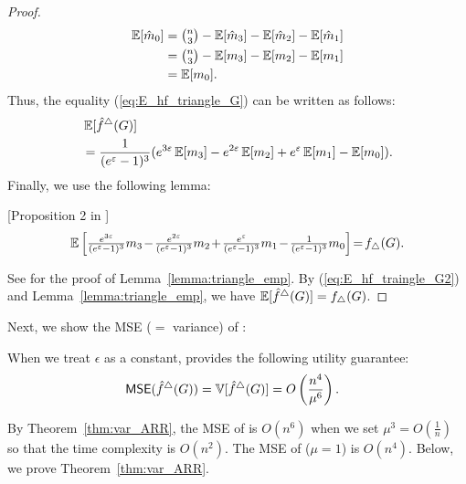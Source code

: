 \begin{proof}
\begin{align*}
\operatorname{\mathbb{E}}[\hat{m}_0]
&= \textstyle{\binom{n}{3} - \operatorname{\mathbb{E}}[\hat{m}_3] - \operatorname{\mathbb{E}}[\hat{m}_2] - \operatorname{\mathbb{E}}[\hat{m}_1]} \\
&= \textstyle{\binom{n}{3} - \operatorname{\mathbb{E}}[m_3] - \operatorname{\mathbb{E}}[m_2] - \operatorname{\mathbb{E}}[m_1]} \\
&= \operatorname{\mathbb{E}}[m_0].
\end{align*}
Thus, the equality (\ref{eq:E_hf_triangle_G}) can be written as follows:
\begin{align}
& \E[\hf^\triangle(G)] \nonumber\\
&= \frac{1}{(e^\epsilon-1)^3}(e^{3\epsilon} \E[m_3] - e^{2\epsilon} \E[m_2] + e^\epsilon \E[m_1] - \E[m_0]).
\label{eq:E_hf_traingle_G2}
\end{align}
Finally, we use the following lemma:

\begin{lemma}\label{lemma:triangle_emp}[Proposition 2 in \cite{Imola_USENIX21}]
  \begin{align}
      \textstyle{\mathbb{E}\left[ \frac{e^{3\epsilon}}{(e^\epsilon-1)^3} m_3 \hspace{-0.5mm}-\hspace{-0.5mm} \frac{e^{2\epsilon}}{(e^\epsilon-1)^3} m_2 \hspace{-0.5mm}+\hspace{-0.5mm} \frac{e^\epsilon}{(e^\epsilon-1)^3} m_1 \hspace{-0.5mm}-\hspace{-0.5mm} \frac{1}{(e^\epsilon-1)^3} m_0 \right] \hspace{-0.5mm} = \hspace{-0.5mm} f_\triangle(G).}
      \label{eq:triangle_emp}
  \end{align}
\end{lemma}
See \cite{Imola_USENIX21} for the proof of Lemma~\ref{lemma:triangle_emp}.
By (\ref{eq:E_hf_traingle_G2}) and Lemma~\ref{lemma:triangle_emp}, we have $\operatorname{\mathbb{E}}[\hat{f}^\triangle(G)] = f_\triangle(G)$.
\end{proof}

Next, we show the MSE ($=$ variance) of \AlgARRTri{}:
\begin{theorem}
\label{thm:var_ARR}
When we treat $\epsilon$ as a constant,
\AlgARRTri{} provides the following utility guarantee:
\begin{align*}
& \operatorname{\textsf{MSE}}(\hat{f}^\triangle(G)) = \operatorname{\mathbb{V}}[\hat{f}^\triangle(G)] = O\left(\frac{n^4}{\mu^6}\right).
\end{align*}
\end{theorem}
By Theorem~\ref{thm:var_ARR}, the MSE of \AlgARRTri{} is $O(n^6)$ when we set $\mu^3=O(\frac{1}{n})$ so that the time complexity is $O(n^2)$.
The MSE of \AlgRRTri{} ($\mu=1$) is $O(n^4)$.
Below, we prove Theorem~\ref{thm:var_ARR}.

